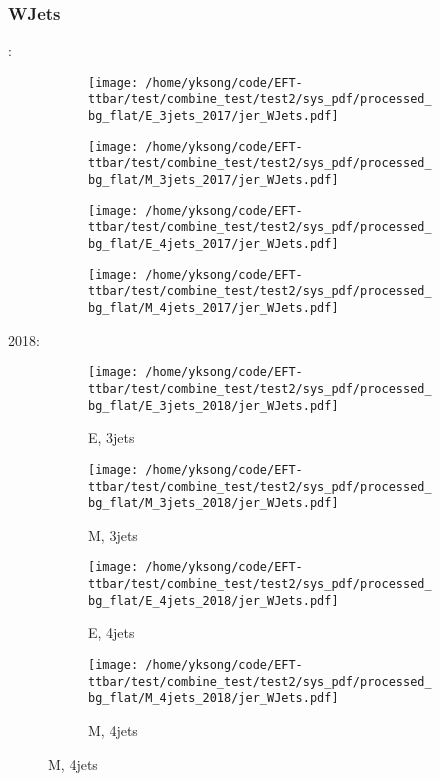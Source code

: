\documentclass{beamer}
\begin{document}
\begin{frame}
\frametitle{WJets}
\fontsize{5}{1}:
\begin{figure}
\centering
\begin{subfigure}[b]{0.24\textwidth}
\texttt{[image: /home/yksong/code/EFT-ttbar/test/combine\_test/test2/sys\_pdf/processed\_bg\_flat/E\_3jets\_2017/jer\_WJets.pdf]}
\end{subfigure}
\begin{subfigure}[b]{0.24\textwidth}
\texttt{[image: /home/yksong/code/EFT-ttbar/test/combine\_test/test2/sys\_pdf/processed\_bg\_flat/M\_3jets\_2017/jer\_WJets.pdf]}
\end{subfigure}
\begin{subfigure}[b]{0.24\textwidth}
\texttt{[image: /home/yksong/code/EFT-ttbar/test/combine\_test/test2/sys\_pdf/processed\_bg\_flat/E\_4jets\_2017/jer\_WJets.pdf]}
\end{subfigure}
\begin{subfigure}[b]{0.24\textwidth}
\texttt{[image: /home/yksong/code/EFT-ttbar/test/combine\_test/test2/sys\_pdf/processed\_bg\_flat/M\_4jets\_2017/jer\_WJets.pdf]}
\end{subfigure}
\end{figure}
2018:
\begin{figure}
\centering
\begin{subfigure}[b]{0.24\textwidth}
\texttt{[image: /home/yksong/code/EFT-ttbar/test/combine\_test/test2/sys\_pdf/processed\_bg\_flat/E\_3jets\_2018/jer\_WJets.pdf]}
\captionsetup{font=tiny}
\caption{E, 3jets}
\end{subfigure}
\begin{subfigure}[b]{0.24\textwidth}
\texttt{[image: /home/yksong/code/EFT-ttbar/test/combine\_test/test2/sys\_pdf/processed\_bg\_flat/M\_3jets\_2018/jer\_WJets.pdf]}
\captionsetup{font=tiny}
\caption{M, 3jets}
\end{subfigure}
\begin{subfigure}[b]{0.24\textwidth}
\texttt{[image: /home/yksong/code/EFT-ttbar/test/combine\_test/test2/sys\_pdf/processed\_bg\_flat/E\_4jets\_2018/jer\_WJets.pdf]}
\captionsetup{font=tiny}
\caption{E, 4jets}
\end{subfigure}
\begin{subfigure}[b]{0.24\textwidth}
\texttt{[image: /home/yksong/code/EFT-ttbar/test/combine\_test/test2/sys\_pdf/processed\_bg\_flat/M\_4jets\_2018/jer\_WJets.pdf]}
\captionsetup{font=tiny}
\caption{M, 4jets}
\end{subfigure}
\end{figure}
\end{frame}
\end{document}

